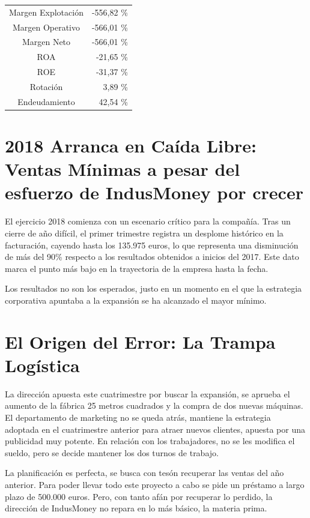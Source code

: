 \begin{table}[h]
    \centering
    \begin{tabular}{|c|r|}
        \hline
        Margen Explotación  & -556,82 \% \\
        Margen Operativo    & -566,01 \% \\
        Margen Neto         & -566,01 \% \\
        ROA                 & -21,65 \% \\
        ROE                 & -31,37 \% \\
        Rotación            & 3,89 \% \\
        Endeudamiento       & 42,54 \% \\
        \hline
    \end{tabular}
\end{table}

\section*{2018 Arranca en Caída Libre: Ventas Mínimas a pesar del esfuerzo de IndusMoney por crecer}
El ejercicio 2018 comienza con un escenario crítico para la compañía. Tras un cierre de año difícil, el primer trimestre registra un desplome histórico en la facturación, cayendo hasta los 135.975 euros, lo que representa una disminución de más del 90\% respecto a los resultados obtenidos a inicios del 2017. Este dato marca el punto más bajo en la trayectoria de la empresa hasta la fecha.  

Los resultados no son los esperados, justo en un momento en el que la estrategia corporativa apuntaba a la expansión se ha alcanzado el mayor mínimo. 

\section*{El Origen del Error: La Trampa Logística}
La dirección apuesta este cuatrimestre por buscar la expansión, se aprueba el aumento de la fábrica 25 metros cuadrados y la compra de dos nuevas máquinas. El departamento de marketing no se queda atrás, mantiene la estrategia adoptada en el cuatrimestre anterior para atraer nuevos clientes, apuesta por una publicidad muy potente. En relación con los trabajadores, no se les modifica el sueldo, pero se decide mantener los dos turnos de trabajo. 

La planificación es perfecta, se busca con tesón recuperar las ventas del año anterior. Para poder llevar todo este proyecto a cabo se pide un préstamo a largo plazo de 500.000 euros. Pero, con tanto afán por recuperar lo perdido, la dirección de IndusMoney no repara en lo más básico, la materia prima.  

